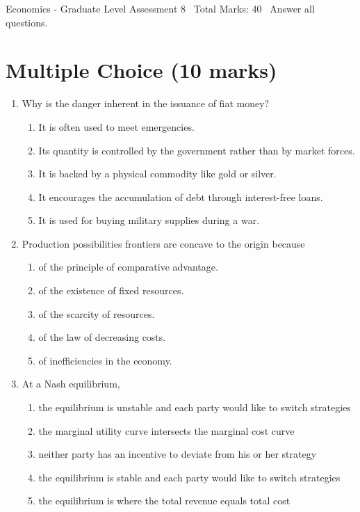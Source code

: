 \documentclass[12pt]{article}
\begin{document}
\begin{center}
Economics - Graduate Level Assessment 8 \
Total Marks: 40 \
Answer all questions.
\end{center}

\section*{Multiple Choice (10 marks)}
\begin{enumerate}[label=\arabic*.]
\item Why is the danger inherent in the issuance of fiat money?
\begin{enumerate}[label=(\alph*)]
    \item It is often used to meet emergencies.
    \item Its quantity is controlled by the government rather than by market forces.
    \item It is backed by a physical commodity like gold or silver.
    \item It encourages the accumulation of debt through interest-free loans.
    \item It is used for buying military supplies during a war.
\end{enumerate}
\item Production possibilities frontiers are concave to the origin because
\begin{enumerate}[label=(\alph*)]
    \item of the principle of comparative advantage.
    \item of the existence of fixed resources.
    \item of the scarcity of resources.
    \item of the law of decreasing costs.
    \item of inefficiencies in the economy.
\end{enumerate}
\item At a Nash equilibrium,
\begin{enumerate}[label=(\alph*)]
    \item the equilibrium is unstable and each party would like to switch strategies
    \item the marginal utility curve intersects the marginal cost curve
    \item neither party has an incentive to deviate from his or her strategy
    \item the equilibrium is stable and each party would like to switch strategies
    \item the equilibrium is where the total revenue equals total cost

\end{enumerate}
\end{enumerate}
\end{document}
